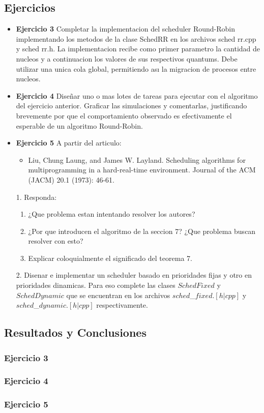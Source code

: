 
\subsection{Ejercicios}
\begin{itemize}
 \item 
\textbf{Ejercicio 3}  Completar la implementacion del scheduler Round-Robin implementando los
metodos de la clase SchedRR en los archivos sched rr.cpp y sched rr.h. La implementacion
recibe como primer parametro la cantidad de nucleos y a continuacion los valores de sus
respectivos quantums. Debe utilizar una unica cola global, permitiendo ası la migracion de
procesos entre nucleos.
\item \textbf{Ejercicio 4} Diseñar uno o mas lotes de tareas para ejecutar con el algoritmo del ejercicio
anterior. Graficar las simulaciones y comentarlas, justificando brevemente por que el comportamiento 
observado es efectivamente el esperable de un algoritmo Round-Robin.
\item \textbf{Ejercicio 5} A partir del articulo:\\
\begin{itemize}
 \item Liu, Chung Laung, and James W. Layland. Scheduling algorithms for multiprogramming
in a hard-real-time environment. Journal of the ACM (JACM) 20.1 (1973): 46-61.
\end{itemize}
1. Responda:
\begin{enumerate}
 \item ¿Que problema estan intentando resolver los autores?
 \item ¿Por que introducen el algoritmo de la seccion 7? ¿Que problema buscan resolver
con esto?
\item Explicar coloquialmente el significado del teorema 7.
\end{enumerate}
2. Disenar e implementar un scheduler basado en prioridades fijas y otro en prioridades
dinamicas. Para eso complete las clases $SchedFixed$ y $SchedDynamic$ que se encuentran
en los archivos $sched$\_$fixed.[h|cpp]$ y $sched$\_$dynamic.[h|cpp]$ respectivamente.
\end{itemize}


\subsection{Resultados y Conclusiones}

\subsubsection[Resolución Ejercicio 3]{Ejercicio 3}

\subsubsection[Resolución Ejercicio 4]{Ejercicio 4}

\subsubsection[Resolución Ejercicio 5]{Ejercicio 5}

